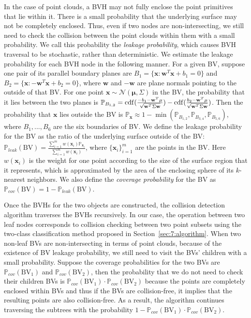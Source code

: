 In the case of point clouds, a BVH may not fully enclose the point primitives that lie within it.
There is a small probability that the underlying surface may not be completely enclosed. Thus, even if two nodes are non-intersecting, we still need to check the collision between the point clouds within them with a small probability. We call this probability the \emph{leakage probability},
which causes BVH traversal to be stochastic, rather than deterministic. We estimate the leakage probability for each BVH node in the following manner.
For a given BV, suppose one pair of its parallel boundary planes are $B_1 = \{\mathbf x: \mathbf w^T \mathbf x + b_1 = 0\}$ and $B_2 = \{\mathbf x: -\mathbf w^T \mathbf x + b_2 = 0\}$,
where $\mathbf w$ and $-\mathbf w$ are plane normals pointing to the outside of that BV. For one point $\mathbf x \sim \mathcal{N}(\mathbf \mu, \Sigma)$ in the BV, the probability that it lies between
the two planes is $\mathbb{P}_{B_{1,2}} = \erf(\frac{-b_1 - \mathbf w^T \mu}{\sqrt{\mathbf w^T \Sigma \mathbf w}}) - \erf(\frac{b_2 - \mathbf w^T \mu}{\sqrt{\mathbf w^T \Sigma \mathbf w}})$.
Then the probability that $\mathbf x$ lies outside the BV
is $\mathbb{P}_{\mathbf x} \approx 1 - \min(\mathbb{P}_{B_{1,2}}, \mathbb{P}_{B_{3,4}}, \mathbb{P}_{B_{5,6}})$, where $B_1, ..., B_6$ are the six boundaries of BV. We define the
leakage probability for the BV as the ratio of the underlying surface outside of the BV: $\mathbb{P}_{leak}(\text{BV}) = \frac{\sum_{i=1}^m w(\mathbf x_i) \mathbb{P}_{\mathbf x_i}}{\sum_{i=1}^m w(\mathbf x_i)}$, where $\{\mathbf x_i\}_{i=1}^m$ are the points in the BV.
Here $w(\mathbf x_i)$ is the weight for one point according to the size of the surface region that it represents, which is approximated by the area of the enclosing sphere of its $k$-nearest neighbors. We also define the {\em coverage probability} for the BV as $\mathbb{P}_{cov}(\text{BV}) = 1 - \mathbb{P}_{leak}(\text{BV})$.


Once the BVHs for the two objects are constructed, the collision detection algorithm traverses the BVHs recursively.
In our case, the operation between two leaf nodes corresponds to
collision checking between two point subsets using the two-class classification method proposed in Section~\ref{sec:7:algorithm}.
When two non-leaf BVs are non-intersecting in terms of point clouds, because of the existence of
BV leakage probability, we still need to visit the BVs' children with a small probability. Suppose the coverage probabilities for the two BVs are $\mathbb{P}_{cov}(\text{BV}_1)$ and $\mathbb{P}_{cov}(\text{BV}_2)$, then the probability that we do not need to check their children BVs
is $\mathbb{P}_{cov}(\text{BV}_1) \cdot \mathbb{P}_{cov}(\text{BV}_2)$ because the points are completely enclosed within BVs
and thus if the BVs are collision-free, it implies that the resulting points are also collision-free. As a result, the algorithm continues traversing the
subtrees with the probability $1 - \mathbb{P}_{cov}(\text{BV}_1) \cdot \mathbb{P}_{cov}(\text{BV}_2)$.


